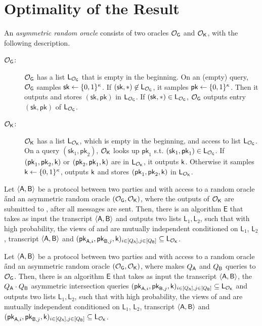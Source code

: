 \section{Optimality of the Result}

\newcommand{\OG}{\ensuremath{\O_{\mathsf{G}}}\xspace}
\newcommand{\OK}{\ensuremath{\O_{\mathsf{K}}}\xspace}
\newcommand{\sk}{\ensuremath{\mathsf{sk}}\xspace}
\newcommand{\pk}{\ensuremath{\mathsf{pk}}\xspace}
\renewcommand{\L}{\ensuremath{\mathsf{L}}\xspace}
\newcommand{\LOG}{\ensuremath{\L_{\OG}}\xspace}
\newcommand{\LOK}{\ensuremath{\L_{\OK}}\xspace}
\newcommand{\E}{\ensuremath{\mathsf{E}}\xspace}



\begin{definition}
An \emph{asymmetric random oracle} consists of two oracles \OG and \OK, with the following description.
\begin{description}
\item[\OG:] \OG has a list \LOG that is empty in the beginning. On an (empty) query, \OG samples $\sk\leftarrow\bits^{\sec}$. If $(\sk,*)\not\in\LOG$, it samples  $\pk\leftarrow\bits^{\sec}$. Then it outputs and stores  $(\sk,\pk)$ in \LOG. If $(\sk,*)\in\LOG$, \OG outputs entry $(\sk,\pk)$ of \LOG.
\item[\OK:] \OK has a list \LOK, which is empty in the beginning, and access to list \LOG. On a query $(\sk_1,\pk_2)$, \OK looks up $\pk_1$ s.t. $(\sk_1,\pk_1)\in\LOG$. If $(\pk_1,\pk_2,\key)$ or $(\pk_2,\pk_1,\key)$ are in \LOK, it outputs $\mathsf{k}$. Otherwise it samples $\mathsf{k}\leftarrow\{0,1\}^{\kappa}$, outputs $\mathsf{k}$ and stores $(\pk_1,\pk_2,\key)$ in \LOK.  
\end{description} 
\end{definition}

\begin{lemma}
Let $\langle \mathsf{A}, \mathsf{B}\rangle$ be a protocol between two parties \A and \B with access to a random oracle \H and an asymmetric random oracle $(\OG, \OK)$, where the outputs of \OK are submitted to \A, \B after all messages are sent. Then, there is an algorithm \E that takes as input the transcript $\langle \mathsf{A}, \mathsf{B}\rangle$ and outputs two lists $\L_1, \L_2$, such that with high probability, the views of \A and \B are mutually independent conditioned on $\L_1$, $\L_2$, transcript $\langle \mathsf{A}, \mathsf{B}\rangle$ and $(\pk_{\A,i},\pk_{\B,j},\key)_{i\in[Q_{\A}],j\in[Q_{\B}]}\subseteq\LOK$.
\end{lemma}

\begin{lemma}
Let $\langle \mathsf{A}, \mathsf{B}\rangle$ be a protocol between two parties \A and \B with access to a random oracle \H and an asymmetric random oracle $(\OG, \OK)$, where \A makes $Q_{\mathsf{A}}$ and \B $Q_{\mathsf{B}}$ queries to $\OG$. Then, there is an algorithm \E that takes as input the transcript $\langle \mathsf{A}, \mathsf{B}\rangle$, the $Q_{\mathsf{A}}\cdot Q_{\mathsf{B}}$ asymmetric intersection queries $(\pk_{\A,i},\pk_{\B,j},\key)_{i\in[Q_{\A}],j\in[Q_{\B}]}\subseteq\LOK$ and outputs two lists $\L_1, \L_2$, such that with high probability, the views of \A and \B are mutually independent conditioned on $\L_1$, $\L_2$, transcript $\langle \mathsf{A}, \mathsf{B}\rangle$ and $(\pk_{\A,i},\pk_{\B,j},\key)_{i\in[Q_{\A}],j\in[Q_{\B}]}\subseteq\LOK$.
\end{lemma}